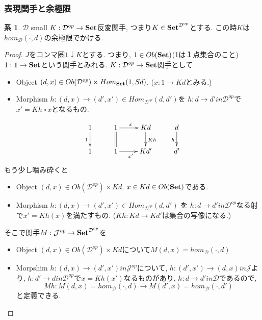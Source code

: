 \documentclass[dvipdfmx,a4paper,11pt]{article}
\theoremstyle{definition}
\newtheorem{cor}[thm]{系}
\begin{document}
\subsubsection{表現関手と余極限}

 \begin{tcolorbox}
 [colback = white, colframe = green!35!black, fonttitle = \bfseries,breakable = true]
\begin{cor}
\label{cor-colim-represent}
$\mathcal{D}$ small 
$K : \mathcal{D}^{op} \to {\bf Set}$反変関手, つまり$K \in {\bf Set}^{\mathcal{D}^{op}}$とする.
この時$K$は$hom_{\mathcal{D}}(\cdot, d)$の余極限でかける. 
\end{cor}
\end{tcolorbox}

\begin{proof}
$J$をコンマ圏$1 \downarrow K$とする.
つまり,
$1 \in Ob({\bf Set})$(1は１点集合のこと)
$1 :  {\bf 1} \to {\bf Set}$という関手とみれる. 
$K : \mathcal{D}^{op} \to {\bf Set}$関手として
\begin{itemize}
\item Object $(d,x) \in Ob(\mathcal{D}^{op}) \times Hom_{{\bf Set}}(1, Sd)$. ($x : 1 \to Kd$とみる.) 
\item Morphism $h : (d,x)  \to (d',x') \in Hom_{\mathcal{D}^{op}}(d,d') $を 
$h: d \to d' in \mathcal{D}^{op}$で$x'  = Kh \circ x$となるもの.
\end{itemize}

\begin{equation*}
\xymatrix@C=25pt@R=20pt{
1 \ar@{->}[d] _{1}&1\ar@{=}[d] \ar@{->}[r]^{x} & Kd\ar@{->}[d]^{Kh} &d\ar@{->}[d]_{h}\\
1&1\ar@{->}[r]_{x'} &Kd'&d' \\   
}
\end{equation*}
もう少し噛み砕くと
\begin{itemize}
\item Object $(d,x) \in Ob(\mathcal{D}^{op}) \times Kd$. $x \in Kd \in Ob({\bf Set})$である.
\item Morphism $h : (d,x)  \to (d',x') \in Hom_{\mathcal{D}^{op}}(d,d')$ を
$h: d \to d' in \mathcal{D}^{op}$なる射で$x' = Kh(x)$を満たすもの. ($Kh : Kd \to Kd'$は集合の写像になる.)
\end{itemize}

そこで関手$M : \mathcal{J}^{op} \to {\bf Set }^{\mathcal{D}^{op}}$を
\begin{itemize}
\item Object $(d,x) \in Ob(\mathcal{D}^{op}) \times Kd$について$M(d,x) = hom_{\mathcal{D}}(\cdot, d)$
\item Morpshim $h : (d,x)  \to (d',x') in \mathcal{J}^{op} $について, 
$h : (d',x') \to (d,x) in \mathcal{J}$より, 
$h : d'  \to d in \mathcal{D}^{op}$で$x = Kh(x')$なるものがあり, 
$h : d \to d' in \mathcal{D} $であるので, 
$$Mh :  M(d,x) = hom_{\mathcal{D}}( \cdot, d) \to  M(d',x) = hom_{\mathcal{D}}(\cdot, d') $$と定義できる. 
\end{itemize}


\end{proof}
\end{document}

